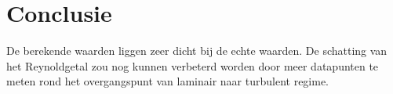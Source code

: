 \section{Conclusie}
De berekende waarden liggen zeer dicht bij de echte waarden. 
De schatting van het Reynoldgetal zou nog kunnen verbeterd worden door meer datapunten 
te meten rond het overgangspunt van laminair naar turbulent regime.